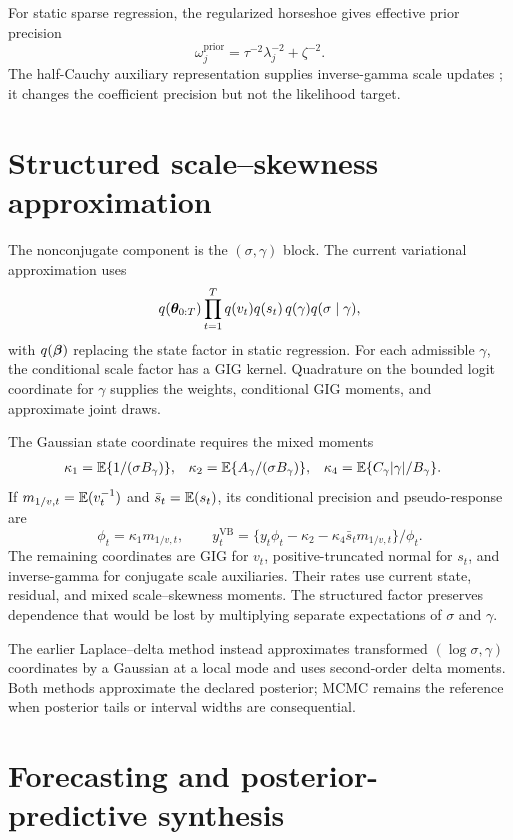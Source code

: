 For static sparse regression, the regularized horseshoe gives effective
prior precision
\[
\omega_j^{\mathrm{prior}}
=\tau^{-2}\lambda_j^{-2}+\zeta^{-2}.
\]
The half-Cauchy auxiliary representation supplies inverse-gamma scale updates
\citep{exd-nishimura2023shrunken}; it changes the coefficient precision but
not the likelihood target.

\section{Structured scale--skewness approximation}
\label{app:exdqlm-ldvb}

The nonconjugate component is the \((\sigma,\gamma)\) block. The current
variational approximation uses
\[
q(\boldsymbol{\theta}_{0:T})\prod_{t=1}^Tq(v_t)q(s_t)\,
q(\gamma)q(\sigma\mid\gamma),
\]
with \(q(\boldsymbol{\beta})\) replacing the state factor in static regression.
For each admissible \(\gamma\), the conditional scale factor has a GIG
kernel. Quadrature on the bounded logit coordinate for \(\gamma\) supplies
the weights, conditional GIG moments, and approximate joint draws.

The Gaussian state coordinate requires the mixed moments
\begin{align}
\kappa_1&=\mathbb{E}\{1/(\sigma B_\gamma)\},&
\kappa_2&=\mathbb{E}\{A_\gamma/(\sigma B_\gamma)\},&
\kappa_4&=\mathbb{E}\{C_\gamma|\gamma|/B_\gamma\}.
\label{exd:eq:dyn_exdqlm_kappa}
\end{align}
If \(m_{1/v,t}=\mathbb{E}(v_t^{-1})\) and
\(\bar s_t=\mathbb{E}(s_t)\), its conditional precision and pseudo-response are
\begin{equation}
\phi_t=\kappa_1m_{1/v,t},
\qquad
y_t^{\mathrm{VB}}
=\{y_t\phi_t-\kappa_2-\kappa_4\bar s_tm_{1/v,t}\}/\phi_t.
\label{exd:eq:dyn_exdqlm_vb_pseudo}
\end{equation}
The remaining coordinates are GIG for \(v_t\), positive-truncated normal for
\(s_t\), and inverse-gamma for conjugate scale auxiliaries. Their rates use
current state, residual, and mixed scale--skewness moments. The structured
factor preserves dependence that would be lost by multiplying separate
expectations of \(\sigma\) and \(\gamma\).

The earlier Laplace--delta method instead approximates transformed
\((\log\sigma,\gamma)\) coordinates by a Gaussian at a local mode and uses
second-order delta moments. Both methods approximate the declared posterior;
MCMC remains the reference when posterior tails or interval widths are
consequential.

\section{Forecasting and posterior-predictive synthesis}
\label{app:exdqlm-synthesis}

